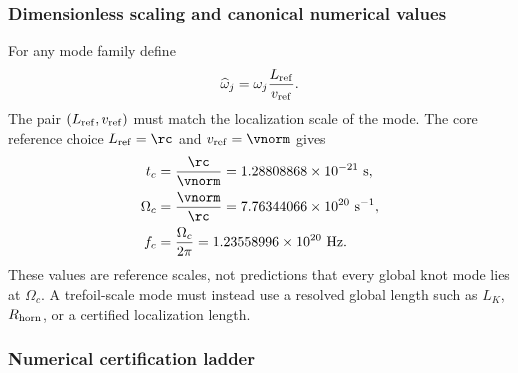     \subsubsection*{Dimensionless scaling and canonical numerical values}

        For any mode family define
        \begin{equation}
            \widehat\omega_j
            =
            \omega_j
            \frac{L_{\rm ref}}{v_{\rm ref}}.
            \label{eq:rt_qss_dimensionless_frequency}
        \end{equation}
        The pair \((L_{\rm ref},v_{\rm ref})\) must match the localization scale of the
        mode.  The core reference choice
        \(L_{\rm ref}=\rc\) and \(v_{\rm ref}=\vnorm\) gives
        \begin{align}
            t_c
            &=
            \frac{\rc}{\vnorm}
            =
            1.28808868\times10^{-21}\ \mathrm{s},
            \\
            \Omega_c
            &=
            \frac{\vnorm}{\rc}
            =
            7.76344066\times10^{20}\ \mathrm{s^{-1}},
            \\
            f_c
            &=
            \frac{\Omega_c}{2\pi}
            =
            1.23558996\times10^{20}\ \mathrm{Hz}.
            \label{eq:rt_qss_canonical_scales}
        \end{align}
        These values are reference scales, not predictions that every global knot mode
        lies at \(\Omega_c\).  A trefoil-scale mode must instead use a resolved global
        length such as \(L_K\), \(R_{\rm horn}\), or a certified localization length.

    \subsubsection*{Numerical certification ladder}

